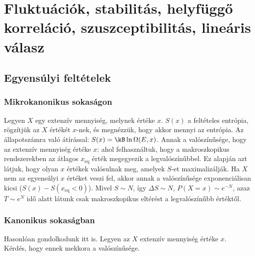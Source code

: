 \chapter{Fluktu\'aci\'ok, stabilit\'as, helyf\"ugg\H{o} korrel\'aci\'o, szuszceptibilit\'as, line\'aris v\'alasz}
 
 \section{Egyensúlyi feltételek}
  
  \subsection{Mikrokanonikus sokaságon}
   
   Legyen $X$ egy extenzív mennyiség, melynek értéke $x$. $S(x)$ a feltételes entrópia, rögzítjük az $X$ értékét $x$-nek, és megnézzük, hogy akkor mennyi az entrópia.
   Az állapotszámra való átírással: $S(x)=\kB\ln\Omega(E,x)$.
   Annak a valószínűsége, hogy az extenzív mennyiség értéke $x$:
   ahol felhasználtuk, hogy a makroszkopikus rendszerekben az átlagos $x_\text{eq}$ érték megegyezik a legvalószínűbbel.
   Ez alapján azt látjuk, hogy olyan $x$ értékek valósulnak meg, amelyek $S$-et maximalizálják.
   Ha $X$ nem az egyensúlyi $x$ értéket veszi fel, akkor annak a valószínűsége exponenciálisan kicsi ($S(x)-S(x_\text{eq}<0)$).
   Mivel $S\sim N$, így $\Delta S\sim N$, $P(X=x)\sim e^{-N}$, azaz $T\sim e^{N}$ idő alatt látunk csak makroszkopikus eltérést a legvalószínűbb értéktől.
   
  \subsection{Kanonikus sokaságban}
   
   Hasonlóan gondolkodunk itt is.
   Legyen az $X$ extenzív mennyiség értéke $x$.
   Kérdés, hogy ennek mekkora a valószínűsége.
   
